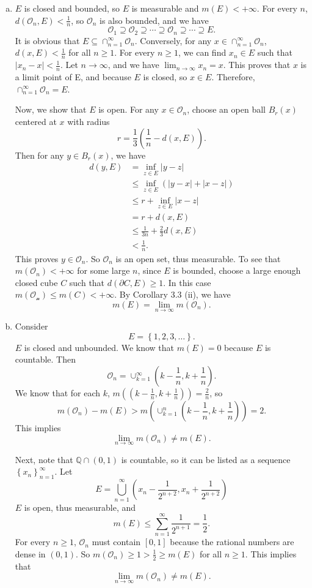 \documentclass[letterpaper, 12pt]{article}
\begin{document}
\begin{solution}
\begin{enumerate}[(a)]
  \item \(E\) is closed and bounded, so \(E\) is measurable and \(m(E)<+\infty\). For every \(n\), \(d(\mathcal{O}_n,E)<\frac{1}{n}\), so \(\mathcal{O}_n\) is also bounded, and we have 
  \[\mathcal{O}_1\supseteq \mathcal{O}_2\supseteq \cdots \supseteq \mathcal{O}_n\supseteq \cdots\supseteq E.\]
  It is obvious that \(E\subseteq \cap_{n=1}^\infty \mathcal{O}_n\). Conversely, for any \(x\in \cap_{n=1}^\infty \mathcal{O}_n\), \(d(x,E)<\frac{1}{n}\) for all \(n\geq 1\). For every \(n\geq 1\), we can find \(x_n\in E\) such that \(|x_n-x|<\frac{1}{n}\). Let \(n\to \infty\), and we have \(\lim_{n\to \infty}x_n=x\). This proves that \(x\) is a limit point of E, and because \(E\) is closed, so \(x\in E\). Therefore, \(\cap_{n=1}^\infty \mathcal{O}_n=E\). 
 
  Now, we show that \(E\) is open. For any \(x\in \mathcal{O}_n\), choose an open ball \(B_r(x)\) centered at \(x\) with radius 
  \[r=\frac{1}{3}(\frac{1}{n}-d(x,E)).\]
  Then for any \(y\in B_r(x)\), we have 
  \begin{align*}
       d(y,E)&=\inf_{z\in E}|y-z|\\ 
             &\leq \inf_{z\in E}(|y-x|+|x-z|)\\
             &\leq r+\inf_{z\in E}|x-z|\\ 
             &= r+d(x,E)\\
             &\leq \frac{1}{3n}+\frac{2}{3}d(x,E)\\
             &<\frac{1}{n}.
  \end{align*}
  This proves \(y\in \mathcal{O}_n\). So \(\mathcal{O}_n\) is an open set, thus measurable. To see that \(m(\mathcal{O}_n)<+\infty\) for some large \(n\), since \(E\) is bounded, choose a large enough closed cube \(C\) such that \(d(\partial C,E)\geq 1\). In this case \(m(\mathcal{O_n})\leq m(C)< +\infty\). By Corollary 3.3 (ii), we have 
  \[m(E)=\lim_{n\to\infty}m(\mathcal{O}_n).\]
  \item Consider 
  \[E=\left\{ 1,2,3,\ldots \right\}.\]
  \(E\) is closed and unbounded. We know that \(m(E)=0\) because \(E\) is countable. Then 
  \[\mathcal{O}_n=\cup_{k=1}^\infty (k-\frac{1}{n},k+\frac{1}{n}).\]
  We know that for each \(k\), \(m((k-\frac{1}{n},k+\frac{1}{n}))=\frac{2}{n}\), so 
  \[m(\mathcal{O}_n)-m(E)>m(\cup_{k=1}^n(k-\frac{1}{n},k+\frac{1}{n}))=2.\]
  This implies 
  \[\lim_{n\to \infty}m(\mathcal{O}_n)\neq m(E).\]

  Next, note that \(\mathbb{Q}\cap (0,1)\) is countable, so it can be listed as a sequence \(\left\{ x_n \right\}_{n=1}^\infty\). Let 
  \[E=\bigcup_{n=1}^\infty(x_n-\frac{1}{2^{n+2}},x_n+\frac{1}{2^{n+2}})\]
  \(E\) is open, thus measurable, and 
  \[m(E)\leq \sum_{n=1}^{\infty}\frac{1}{2^{n+1}}=\frac{1}{2}.\]
  For every \(n\geq 1\), \(\mathcal{O}_n\) must contain \([0,1]\) because the rational numbers are dense in \((0,1)\). So \(m(\mathcal{O}_n)\geq 1>\frac{1}{2}\geq m(E)\) for all \(n\geq 1\). This implies that 
  \[\lim_{n\to \infty}m(\mathcal{O}_n)\neq m(E).\]
\end{enumerate}
\end{solution}
\end{document}
